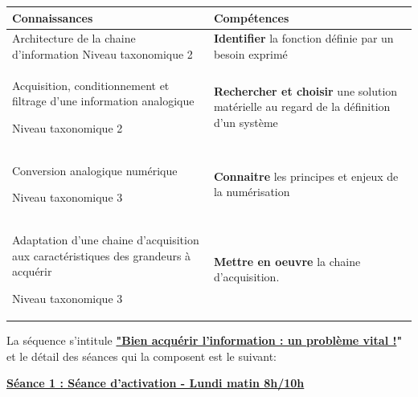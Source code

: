 \documentclass[12pt]{article}
\begin{document}
\begin{tabular}{|p{7.2cm}|p{8cm}|} \hline
\textbf{Connaissances} & \textbf{Compétences} \vspace{5pt} \\ \hline
Architecture de la chaine d'information Niveau taxonomique 2&  \textbf{Identifier} la fonction définie par un besoin exprimé \vspace{5pt} \\ \hline
Acquisition, conditionnement et filtrage d'une information analogique \par Niveau taxonomique 2 &  \textbf{Rechercher et choisir} une solution matérielle au regard de la définition d'un système \vspace{5pt} \\ \hline

Conversion analogique numérique\par Niveau taxonomique 3 &  \textbf{Connaitre} les principes et enjeux de la numérisation \vspace{5pt} \\ \hline

Adaptation d'une chaine d'acquisition aux caractéristiques des grandeurs à acquérir\par Niveau taxonomique 3 &  \textbf{Mettre en oeuvre} la chaine d'acquisition.  \vspace{5pt} \\ \hline




\end{tabular}

\newpage 

La séquence s'intitule \textbf{\underline{"Bien acquérir l'information : un problème vital !}"} et le détail des séances qui la composent est le suivant:\par
\vspace{15pt}
\color{red}
\textbf{\underline{Séance 1 : Séance d'activation - Lundi matin 8h/10h}}\par
\vspace{10pt}
\end{document}
